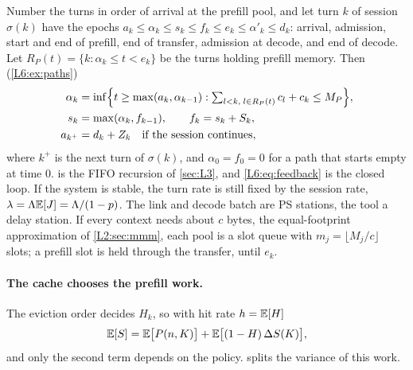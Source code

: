 Number the turns in order of arrival at the prefill pool, and let turn $k$ of session
$\sigma(k)$ have the epochs
$a_k\le\alpha_k\le s_k\le f_k\le e_k\le\alpha'_k\le d_k$: arrival, admission, start and
end of prefill, end of transfer, admission at decode, and end of decode. Let
$R_P(t)=\{k:\alpha_k\le t<e_k\}$ be the turns holding prefill memory. Then
(\cref{L6:ex:paths})
\begin{align}
  \alpha_k&=\inf\Bigl\{t\ge\max(a_k,\alpha_{k-1}):
      \textstyle\sum_{l<k,\;l\in R_P(t)}c_l+c_k\le M_P\Bigr\},\label{L6:eq:admitP}\\
  s_k&=\max(\alpha_k,f_{k-1}),\qquad f_k=s_k+S_k,\label{L6:eq:lindley}\\
  a_{k^+}&=d_k+Z_k\quad\text{if the session continues},\label{L6:eq:feedback}
\end{align}
where $k^+$ is the next turn of $\sigma(k)$, and $\alpha_0=f_0=0$ for a path that starts empty at time $0$.  is the FIFO recursion
of \cref{sec:L3}, and \eqref{L6:eq:feedback} is the closed loop. If the system
is stable, the turn rate is still fixed by the session rate,
$\lambda=\Lambda\mathbb{E}[J]=\Lambda/(1-p)$. The link and decode batch are PS stations, the
tool a delay station. If every context needs about $c$ bytes, the equal-footprint
approximation of \cref{L2:sec:mmm}, each pool is a slot queue with
$m_j=\lfloor M_j/c\rfloor$ slots; a prefill slot is held through the transfer, until
$e_k$.

\paragraph{The cache chooses the prefill work.} The eviction order decides $H_k$, so
with hit rate $h=\mathbb{E}[H]$
\begin{equation}\label{L6:eq:ES}
  \mathbb{E}[S]=\mathbb{E}\bigl[P(n,K)\bigr]+\mathbb{E}\bigl[(1-H)\,\Delta S(K)\bigr],
\end{equation}
and only the second term depends on the policy.  splits the
variance of this work.

